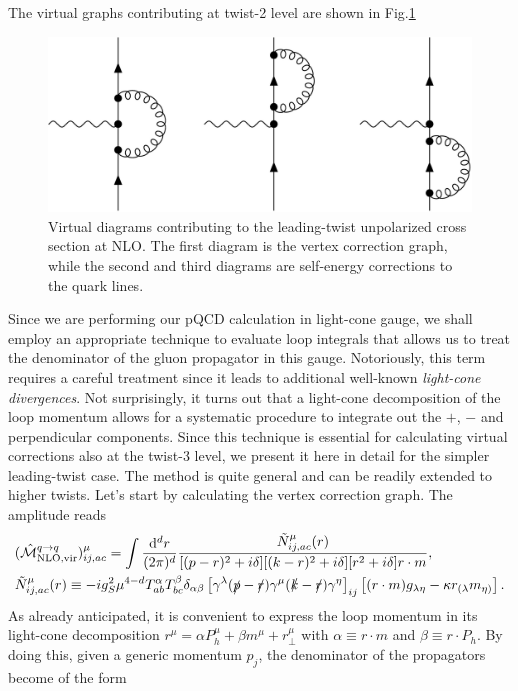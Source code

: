 The virtual graphs contributing at twist-2 level are shown in Fig.\ref{fig:Virt NLO tw2}
\begin{figure}
    \centering
    \includegraphics[width=0.55\linewidth]{fig/VirtNLOTw2.jpg}
    \caption{Virtual diagrams contributing to the leading-twist unpolarized cross section at NLO. The first diagram is the vertex correction graph, while the second and third diagrams are self-energy corrections to the quark lines.}
    \label{fig:Virt NLO tw2}
\end{figure}
\noindent Since we are performing our pQCD calculation in light-cone gauge, we shall employ an appropriate technique to evaluate loop integrals that allows us to treat the denominator of the gluon propagator in this gauge. Notoriously, this term requires a careful treatment since it leads to additional well-known \textit{light-cone divergences}. Not surprisingly, it turns out that a light-cone decomposition of the loop momentum allows for a systematic procedure to integrate out the $+$, $-$ and perpendicular components. Since this technique is essential for calculating virtual corrections also at the twist-3 level, we present it here in detail for the simpler leading-twist case. The method is quite general and can be readily extended to higher twists. Let's start by calculating the vertex correction graph. The amplitude reads
\begin{equation}\label{eq:amplitudevirtualtwist2}
\begin{aligned}
     &(\hat{\mathcal{M}}^{q \to q}_{\text{NLO,vir}})^\mu_{ij,ac} = \int\frac{\dd ^dr}{(2\pi)^d}\frac{\tilde N^\mu_{ij,ac}(r)}{[(p-r)^2+i\delta][(k-r)^2+i\delta][r^2+i\delta]r \cdot m},\\
       & \tilde N^\mu_{ij,ac}(r) \equiv -ig_S^2\mu^{4-d}T^\alpha_{ab} T^\beta_{bc}\delta_{\alpha\beta}\left[\gamma^\lambda(\slashed{p}-\slashed{r})\gamma^\mu(\slashed{k}-\slashed{r})\gamma^\eta\right]_{ij}\left[(r\cdot m)g_{\lambda\eta}-\kappa r_{(\lambda} m_{\eta)}\right].
    \end{aligned}
\end{equation}
As already anticipated, it is convenient to express the loop momentum in its light-cone decomposition $r^\mu = \alpha P_h^\mu+\beta m^\mu+r_\perp^\mu$ with $\alpha\equiv r\cdot m$ and $\beta\equiv r\cdot P_h$. By doing this, given a generic momentum $p_j$, the denominator of the propagators become of the form
